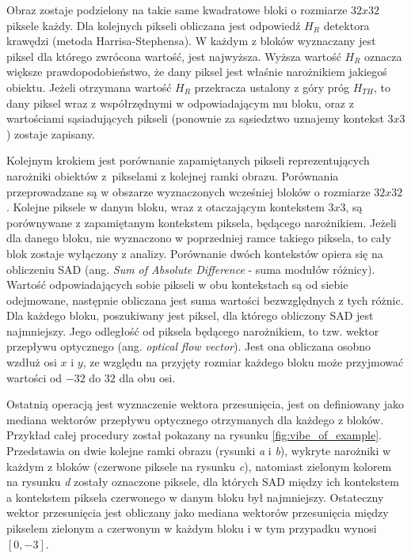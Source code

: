 Obraz zostaje podzielony na takie same kwadratowe bloki o rozmiarze $32x32$ piksele każdy. Dla kolejnych pikseli obliczana jest odpowiedź $H_R$ detektora krawędzi (metoda Harrisa-Stephensa). W każdym z bloków wyznaczany jest piksel dla którego zwrócona wartość, jest najwyższa. Wyższa wartość $H_R$ oznacza większe prawdopodobieństwo, że dany piksel jest właśnie narożnikiem jakiegoś obiektu. Jeżeli otrzymana wartość $H_R$ przekracza ustalony z góry próg $H_{TH}$, to dany piksel wraz z współrzędnymi w odpowiadającym mu bloku, oraz z wartościami sąsiadujących pikseli (ponownie za sąsiedztwo uznajemy kontekst $3x3$) zostaje zapisany.

Kolejnym krokiem jest porównanie zapamiętanych pikseli reprezentujących narożniki obiektów z~pikselami z kolejnej ramki obrazu. Porównania przeprowadzane są w obszarze wyznaczonych wcześniej bloków o rozmiarze $32x32$. Kolejne piksele w danym bloku, wraz z otaczającym kontekstem $3x3$, są porównywane z zapamiętanym kontekstem piksela, będącego narożnikiem. Jeżeli dla danego bloku, nie wyznaczono w poprzedniej ramce takiego piksela, to cały blok zostaje wyłączony z analizy. Porównanie dwóch kontekstów opiera się na obliczeniu SAD (ang. \textit{Sum of Absolute Difference} - suma modułów różnicy). Wartość odpowiadających sobie pikseli w obu kontekstach są od siebie odejmowane, następnie obliczana jest suma wartości bezwzględnych z tych różnic. Dla każdego bloku, poszukiwany jest piksel, dla którego obliczony SAD jest najmniejszy. Jego odległość od piksela będącego narożnikiem, to tzw. wektor przepływu optycznego (ang. \textit{optical flow vector}). Jest ona obliczana osobno wzdłuż osi $x$ i $y$, ze względu na przyjęty rozmiar każdego bloku może przyjmować wartości od $-32$ do $32$ dla obu osi.

Ostatnią operacją jest wyznaczenie wektora przesunięcia, jest on definiowany jako mediana wektorów przepływu optycznego otrzymanych dla każdego z bloków. Przykład całej procedury został pokazany na rysunku \ref{fig:vibe_of_example}. Przedstawia on dwie kolejne ramki obrazu (rysunki \textit{a} i \textit{b}), wykryte narożniki w każdym z bloków (czerwone piksele na rysunku \textit{c}), natomiast zielonym kolorem na rysunku \textit{d} zostały oznaczone piksele, dla których SAD między ich kontekstem a kontekstem piksela czerwonego w danym bloku był najmniejszy. Ostateczny wektor przesunięcia jest obliczany jako mediana wektorów przesunięcia między pikselem zielonym a czerwonym w każdym bloku i w tym przypadku wynosi $[0,-3]$.

